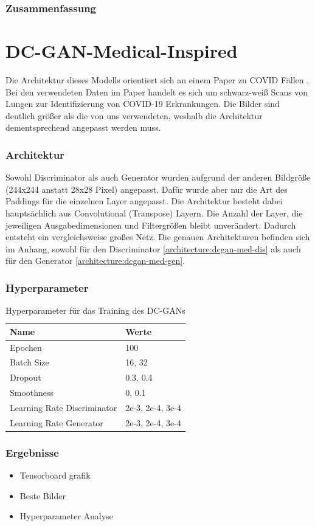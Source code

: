 \subsubsection{Zusammenfassung}

\section{DC-GAN-Medical-Inspired}

Die Architektur dieses Modells orientiert sich an einem Paper zu COVID Fällen \cite{inspiration-dc-gan-med}.
Bei den verwendeten Daten im Paper handelt es sich um schwarz-weiß Scans von Lungen zur Identifizierung von COVID-19 Erkrankungen.
Die Bilder sind deutlich größer als die von uns verwendeten, weshalb die Architektur dementsprechend angepasst werden muss.

\subsubsection{Architektur}
Sowohl Discriminator als auch Generator wurden aufgrund der anderen Bildgröße (244x244 anstatt 28x28 Pixel) angepasst.
Dafür wurde aber nur die Art des Paddings für die einzelnen Layer angepasst.
Die Architektur besteht dabei hauptsächlich aus Convolutional (Transpose) Layern.
Die Anzahl der Layer, die jeweiligen Ausgabedimensionen und Filtergrößen bleibt unverändert.
Dadurch entsteht ein vergleichsweise großes Netz.
Die genauen Architekturen befinden sich im Anhang, sowohl für den Discriminator \cref{architecture:dcgan-med-dis} als auch für den Generator \cref{architecture:dcgan-med-gen}.

\subsubsection{Hyperparameter}
\begin{table}[H]
	\centering
	\begin{tabular}{l l}
		Name                        & Werte            \\ \hline
		Epochen                     & 100              \\
		Batch Size                  & 16, 32           \\
		Dropout                     & 0.3, 0.4         \\
		Smoothness                  & 0, 0.1           \\
		Learning Rate Discriminator & 2e-3, 2e-4, 3e-4 \\
		Learning Rate Generator     & 2e-3, 2e-4, 3e-4
	\end{tabular}
	\caption{Hyperparameter für das Training des DC-GANs}
\end{table}

\subsubsection{Ergebnisse}
\begin{itemize}
	\item Tensorboard grafik
	\item Beste Bilder
	\item Hyperparameter Analyse
\end{itemize}
